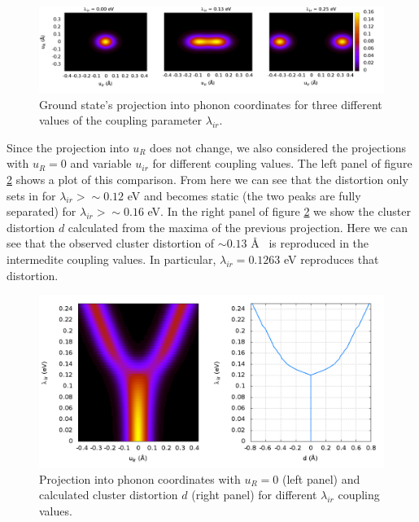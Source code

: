 \begin{figure}[ht!]
  \centering
  \includegraphics[width=1.0\textwidth]{images/ph-ground.png}
  \caption{Ground state's projection into phonon coordinates for three different values of the coupling parameter $\lambda_{ir}$.}
  \label{fig:ph-ground}
\end{figure}

Since the projection into $u_R$ does not change, we also considered the projections with $u_R=0$ and variable $u_{ir}$ for different coupling values.
The left panel of figure \ref{fig:uir-vs-coupl} shows a plot of this comparison.
From here we can see that the distortion only sets in for $\lambda_{ir} > \sim 0.12$ eV and becomes static (the two peaks are fully separated) for $\lambda_{ir} > \sim 0.16$ eV.
In the right panel of figure \ref{fig:uir-vs-coupl} we show the cluster distortion $d$ calculated from the maxima of the previous projection.
Here we can see that the observed cluster distortion of $\sim 0.13$ \AA\ \cite{MustredeLeon1990} is reproduced in the intermedite coupling values. 
In particular, $\lambda_{ir}=0.1263$ eV reproduces that distortion.

\begin{figure}[ht!]
  \centering
  \includegraphics[width=1.0\textwidth]{images/uir-vs-coupl-d.png}
  \caption{Projection into phonon coordinates with $u_R=0$ (left panel) and calculated cluster distortion $d$ (right panel) for different $\lambda_{ir}$ coupling values.}
  \label{fig:uir-vs-coupl}
\end{figure}

